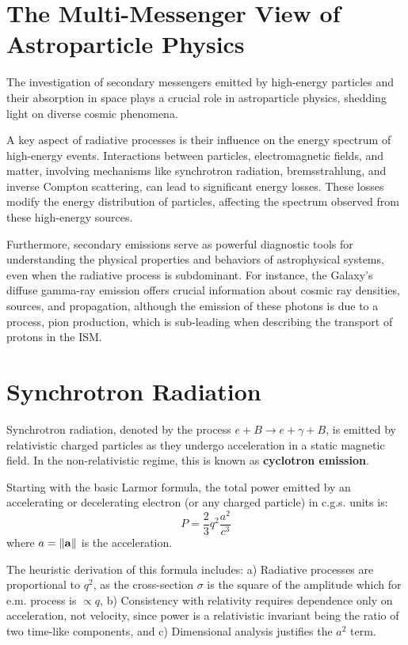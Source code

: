 \section{The Multi-Messenger View of Astroparticle Physics}

The investigation of secondary messengers emitted by high-energy particles and their absorption in space plays a crucial role in astroparticle physics, shedding light on diverse cosmic phenomena. 

A key aspect of radiative processes is their influence on the energy spectrum of high-energy events. Interactions between particles, electromagnetic fields, and matter, involving mechanisms like synchrotron radiation, bremsstrahlung, and inverse Compton scattering, can lead to significant energy losses. These losses modify the energy distribution of particles, affecting the spectrum observed from these high-energy sources.

Furthermore, secondary emissions serve as powerful diagnostic tools for understanding the physical properties and behaviors of astrophysical systems, even when the radiative process is subdominant. 
%
For instance, the Galaxy's diffuse gamma-ray emission offers crucial information about cosmic ray densities, sources, and propagation, although the emission of these photons is due to a process, pion production, which is sub-leading when describing the transport of protons in the ISM.

\section{Synchrotron Radiation}

Synchrotron radiation, denoted by the process \( e + B \rightarrow e + \gamma + B \), is emitted by relativistic charged particles as they undergo acceleration in a static magnetic field. In the non-relativistic regime, this is known as 
\textbf{cyclotron emission}.

Starting with the basic Larmor formula, the total power emitted by an accelerating or decelerating electron (or any charged particle) in c.g.s. units is:
%
\[
P = \frac{2}{3} q^2 \frac{a^2}{c^3}
\]
%
where \( a = \| \vb a \|\) is the acceleration.

The heuristic derivation of this formula includes: a) Radiative processes are proportional to \( q^2 \), as the cross-section \( \sigma \) is the square of the amplitude which for e.m. process is \( \propto q \), b) Consistency with relativity requires dependence only on acceleration, not velocity, since power is a relativistic invariant being the ratio of two time-like components, and c) Dimensional analysis justifies the \( a^2 \) term.

